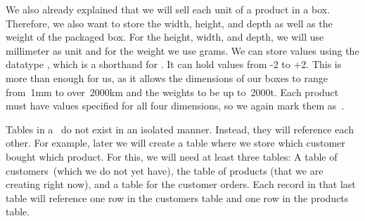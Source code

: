 We also already explained that we will sell each unit of a product in a box.
Therefore, we also want to store the width, height, and depth as well as the weight of the packaged box.
For the height, width, and depth, we will use millimeter as unit and for the weight we use grams.
We can store values using the datatype , which is a shorthand for .
It can hold values from -2 to +2.
This is more than enough for us, as it allows the dimensions of our boxes to range from~1mm to over~2000km and the weights to be up to~2000t.
Each product must have values specified for all four dimensions, so we again mark them as~.

Tables in a \db\ do not exist in an isolated manner.
Instead, they will reference each other.
For example, later we will create a table where we store which customer bought which product.
For this, we will need at least three tables:
A table of customers~(which we do not yet have), the table of products (that we are creating right now), and a table for the customer orders.
Each record in that last table will reference one row in the customers table and one row in the products table.

